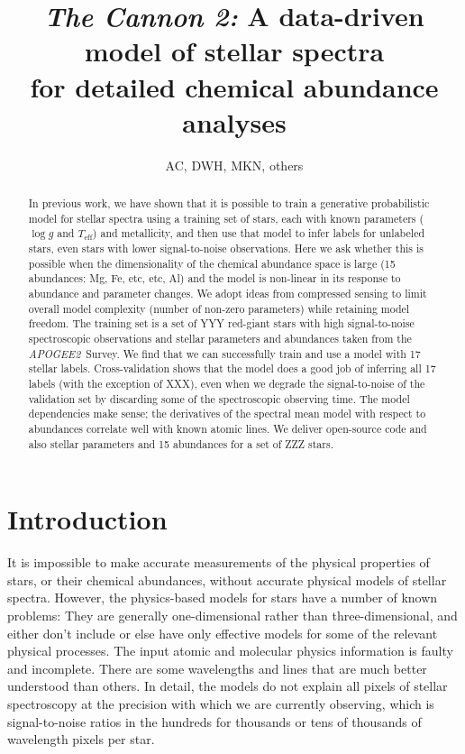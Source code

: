 \documentclass[12pt,preprint]{aastex}
\newcommand{\project}[1]{\textsl{#1}}
\newcommand{\acronym}[1]{{\small{#1}}}
\newcommand{\apogee}{\project{\acronym{APOGEE2}}}
\newcommand{\logg}{\log g}
\newcommand{\Teff}{T_{\mathrm{eff}}}
\begin{document}
\title{\textsl{The Cannon 2:} A data-driven model of stellar spectra \\
       for detailed chemical abundance analyses}
\author{AC, DWH, MKN, others}

\begin{abstract}
In previous work, we have shown that it is possible to train a generative
probabilistic model for stellar spectra using a training set of stars, each with known
parameters ($\logg$ and $\Teff$) and metallicity, and then use that model to infer labels for
unlabeled stars, even stars with lower signal-to-noise observations.
Here we ask whether this is possible when the dimensionality of the chemical
abundance space is large (15 abundances: Mg, Fe, etc, etc, Al)
and the model is non-linear in its response to abundance and parameter changes.
We adopt ideas from compressed sensing to limit overall model complexity (number
of non-zero parameters) while retaining model freedom.
The training set is a set of YYY red-giant stars with high signal-to-noise
spectroscopic observations and stellar parameters and abundances taken from the
\apogee\ Survey.
We find that we can successfully train and use a model with 17 stellar labels.
Cross-validation shows that the model does a good job of inferring all 17 labels
(with the exception of XXX), even when we degrade the signal-to-noise of the
validation set by discarding some of the spectroscopic observing time.
The model dependencies make sense; the derivatives of the spectral mean model
with respect to abundances correlate well with known atomic lines.
We deliver open-source code and also stellar parameters and 15 abundances for a
set of ZZZ stars.
\end{abstract}

\section{Introduction}

It is impossible to make accurate measurements of the physical
properties of stars, or their chemical abundances, without accurate
physical models of stellar spectra.
However, the physics-based models for stars have a number of known
problems:
They are generally one-dimensional rather than three-dimensional, and
either don't include or else have only effective models for some of
the relevant physical processes.
The input atomic and molecular physics information is faulty and
incomplete.
There are some wavelengths and lines that are much better understood
than others.
In detail, the models do not explain all pixels of stellar
spectroscopy at the precision with which we are currently observing,
which is signal-to-noise ratios in the hundreds for thousands or tens
of thousands of wavelength pixels per star.
\end{document}
